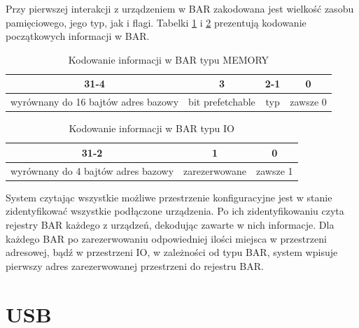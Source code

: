 \documentclass[shortabstract,inz]{iithesis}
\begin{document}
Przy pierwszej interakcji z urządzeniem w BAR zakodowana jest wielkość zasobu pamięciowego,
jego typ, jak i flagi. Tabelki \ref{tab:memorybar} i \ref{tab:iobar} prezentują kodowanie początkowych informacji w BAR.

\begin{table}
\begin{center}
\caption{Kodowanie informacji w BAR typu MEMORY}
\label{tab:memorybar}
\begin{tabular}{|c|c|c|c|}
\hline
\textbf{31-4} & \textbf{3} & \textbf{2-1} & \textbf{0}  \\ \hline
wyrównany do 16 bajtów adres bazowy & bit prefetchable & typ\tablefootnote{\url{https://wiki.osdev.org/PCI\#Base\_Address\_Registers}} & zawsze 0 \\
\hline
\end{tabular}
\end{center}
\end{table}

\begin{table}
\begin{center}
\caption{Kodowanie informacji w BAR typu IO}
\label{tab:iobar}
\begin{tabular}{|c|c|c|}
\hline
\textbf{31-2} & \textbf{1} & \textbf{0}  \\ \hline
wyrównany do 4 bajtów adres bazowy & zarezerwowane & zawsze 1 \\
\hline
\end{tabular}
\end{center}
\end{table}


System czytając wszystkie możliwe przestrzenie konfiguracyjne jest w stanie 
zidentyfikować wszystkie podłączone urządzenia. Po ich zidentyfikowaniu czyta rejestry BAR
każdego z urządzeń, dekodując zawarte w nich informacje. 
Dla każdego BAR po zarezerwowaniu odpowiedniej ilości miejsca w przestrzeni adresowej,
bądź w przestrzeni IO, w zależności od typu BAR, system wpisuje 
pierwszy adres zarezerwowanej przestrzeni do rejestru BAR.



\section{USB} %
\label{sec:usb}
\end{document}
